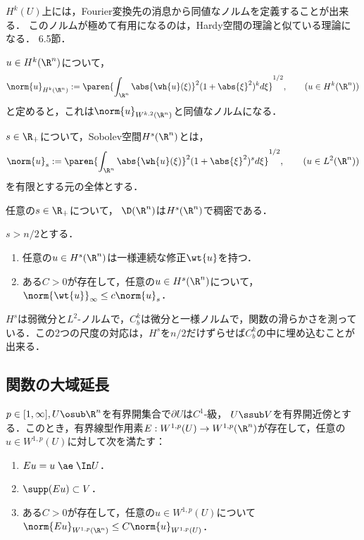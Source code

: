 \documentclass[uplatex,dvipdfmx]{jsreport}
\begin{document}
\begin{tcolorbox}[colframe=ForestGreen, colback=ForestGreen!10!white,breakable,colbacktitle=ForestGreen!40!white,coltitle=black,fonttitle=\bfseries\sffamily,
title=]
    $H^k(U)$上には，Fourier変換先の消息から同値なノルムを定義することが出来る．
    このノルムが極めて有用になるのは，Hardy空間の理論と似ている理論になる．
    \cite{黒田成俊-関数解析} 6.5節．
\end{tcolorbox}

\begin{proposition}
    $u\in H^k(\R^n)$について，
    \[\norm{u}_{H^k(\R^n)}:=\paren{\int_{\R^n}\abs{\wh{u}(\xi)}^2(1+\abs{\xi}^2)^kd\xi}^{1/2},\qquad(u\in H^k(\R^n))\]
    と定めると，これは$\norm{u}_{W^{k,2}(\R^n)}$と同値なノルムになる．
\end{proposition}

\begin{definition}
    $s\in\R_+$について，Sobolev空間$H^s(\R^n)$とは，
    \[\norm{u}_s:=\paren{\int_{\R^n}\abs{\wh{u}(\xi)}^2(1+\abs{\xi}^2)^sd\xi}^{1/2},\qquad(u\in L^2(\R^n))\]
    を有限とする元の全体とする．
\end{definition}

\begin{theorem}
    任意の$s\in\R_+$について，
    $\D(\R^n)$は$H^s(\R^n)$で稠密である．
\end{theorem}

\begin{theorem}[Sobolevの埋蔵定理の特別な場合]
    $s>n/2$とする．
    \begin{enumerate}
        \item 任意の$u\in H^s(\R^n)$は一様連続な修正$\wt{u}$を持つ．
        \item ある$C>0$が存在して，任意の$u\in H^s(\R^n)$について，$\norm{\wt{u}}_{\infty}\le c\norm{u}_s$．
    \end{enumerate}
\end{theorem}
\begin{remarks}
    $H^s$は弱微分と$L^2$-ノルムで，$C_b^k$は微分と一様ノルムで，関数の滑らかさを測っている．この2つの尺度の対応は，$H^s$を$n/2$だけずらせば$C_b^k$の中に埋め込むことが出来る．
\end{remarks}

\subsection{関数の大域延長}

\begin{theorem}
    $p\in[1,\infty],U\osub\R^n$を有界開集合で$\partial U$は$C^1$-級，
    $U\ssub V$を有界開近傍とする．このとき，有界線型作用素$E:W^{1,p}(U)\to W^{1,p}(\R^n)$が存在して，任意の$u\in W^{1,p}(U)$に対して次を満たす：
    \begin{enumerate}
        \item $Eu=u\;\ae\;\In U$．
        \item $\supp(Eu)\subset V$．
        \item ある$C>0$が存在して，任意の$u\in W^{1,p}(U)$について$\norm{Eu}_{W^{1,p}(\R^n)}\le C\norm{u}_{W^{1,p}(U)}$．
    \end{enumerate}
\end{theorem}
\end{document}
